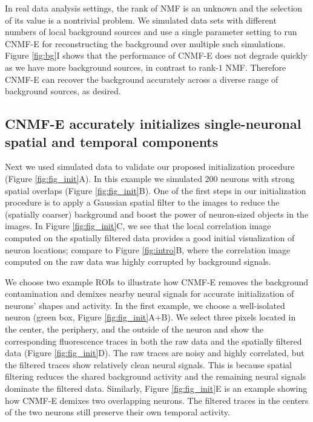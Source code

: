 \documentclass[9pt,lineno]{elife}
\begin{document}
In real data analysis settings, the rank of NMF is an unknown  and the selection of its value is a nontrivial problem. We simulated data sets with different numbers of local background sources and use a single parameter setting to run CNMF-E for reconstructing the background over multiple such simulations. Figure \ref{fig:bg}I shows that the performance of CNMF-E does not degrade quickly as we have more background sources, in contrast to  rank-$1$ NMF. Therefore CNMF-E can recover the background accurately across a diverse range of background sources, as desired.  

\subsection{CNMF-E accurately initializes single-neuronal spatial and temporal components} \label{sec:init_results}

Next we used simulated data to validate our proposed initialization procedure (Figure \ref{fig:fig_init}A). 
In this example we simulated $200$ neurons with strong spatial overlaps (Figure \ref{fig:fig_init}B). One of the first steps in our initialization procedure is to apply a Gaussian spatial filter to the images to reduce the (spatially coarser) background and boost the power of neuron-sized objects in the images. In Figure \ref{fig:fig_init}C, we see that the local correlation image \citep{Smith2010} computed on the spatially filtered data provides a good initial visualization of neuron locations; compare to Figure \ref{fig:intro}B, where the correlation image computed on the raw data was highly corrupted by background signals. 

We choose two example ROIs to illustrate how CNMF-E removes the background contamination and demixes nearby neural signals for accurate initialization of neurons' shapes and activity. In the first example, we choose a well-isolated neuron (green box, Figure \ref{fig:fig_init}A+B). We select three pixels located in the center, the periphery, and the outside of the neuron and show the corresponding fluorescence traces in both the raw data and the spatially filtered data (Figure \ref{fig:fig_init}D). The raw traces are noisy and highly correlated, but the filtered traces show relatively clean neural signals. This is because spatial filtering reduces the shared background activity and the remaining neural signals dominate the filtered data. 
Similarly, Figure \ref{fig:fig_init}E is an example showing how CNMF-E demixes two overlapping neurons. The filtered traces in the centers of the two neurons still preserve their own temporal activity. 
\end{document}
